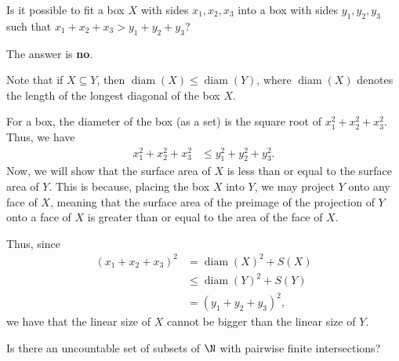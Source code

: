 \documentclass[10pt]{mypackage}
\begin{document}
\begin{problem}
  Is it possible to fit a box $X$ with sides $x_1,x_2,x_3$ into a box with sides $y_1,y_2,y_3$ such that $x_1 + x_2 + x_3 > y_1 + y_2 + y_3$?
\end{problem}
\begin{solution}
  The answer is \textbf{no}.\newline

  Note that if $X\subseteq Y$, then $\operatorname{diam}\left( X \right) \leq \operatorname{diam}\left( Y \right)$, where $\operatorname{diam}\left( X \right)$ denotes the length of the longest diagonal of the box $X$.\newline

  For a box, the diameter of the box (as a set) is the square root of $x_1^2 + x_2^2 + x_3^2$. Thus, we have
  \begin{align*}
    x_1^2 + x_2^2 + x_3^2 &\leq y_1^2 + y_2^2 + y_3^2.
  \end{align*}
  Now, we will show that the surface area of $X$ is less than or equal to the surface area of $Y$. This is because, placing the box $X$ into $Y$, we may project $Y$ onto any face of $X$, meaning that the surface area of the preimage of the projection of $Y$ onto a face of $X$ is greater than or equal to the area of the face of $X$.\newline

  Thus, since
  \begin{align*}
    \left( x_1 + x_2 + x_3 \right)^2 &= \operatorname{diam}\left( X \right)^2 + S(X)\\
                                     &\leq \operatorname{diam}\left( Y \right)^2 + S(Y)\\
                                     &= \left( y_1 + y_2 + y_3 \right)^2,
  \end{align*}
  we have that the linear size of $X$ cannot be bigger than the linear size of $Y$.
\end{solution}
\begin{problem}
Is there an uncountable set of subsets of $\N$ with pairwise finite intersections?
\end{problem}
\end{document}
